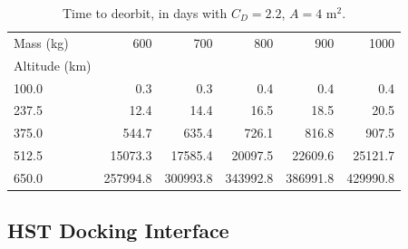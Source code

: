\documentclass[paper=letter, fontsize=11pt]{scrartcl} %
\numberwithin{equation}{section} %
\numberwithin{figure}{section} %
\numberwithin{table}{section} %
\begin{document}
\begin{table}[H]
\begin{center}
\begin{tabular}{lrrrrr}
\toprule
Mass (kg) &           600  &           700  &           800  &           900  &           1000 \\
Altitude (km)     &                &                &                &                &                \\
\midrule
100.0 &       0.3 &       0.3 &       0.4 &       0.4 &       0.4 \\
237.5 &      12.4 &      14.4 &      16.5 &      18.5 &      20.5 \\
375.0 &     544.7 &     635.4 &     726.1 &     816.8 &     907.5 \\
512.5 &   15073.3 &   17585.4 &   20097.5 &   22609.6 &   25121.7 \\
650.0 &  257994.8 &  300993.8 &  343992.8 &  386991.8 &  429990.8 \\
\bottomrule
\end{tabular}
\end{center}
\caption{Time to deorbit, in days with $C_D=2.2$, $A=4$ m$^2$.}
\label{altitude_table}
\end{table}

\subsection{HST Docking Interface} \label{lids}
\end{document}
